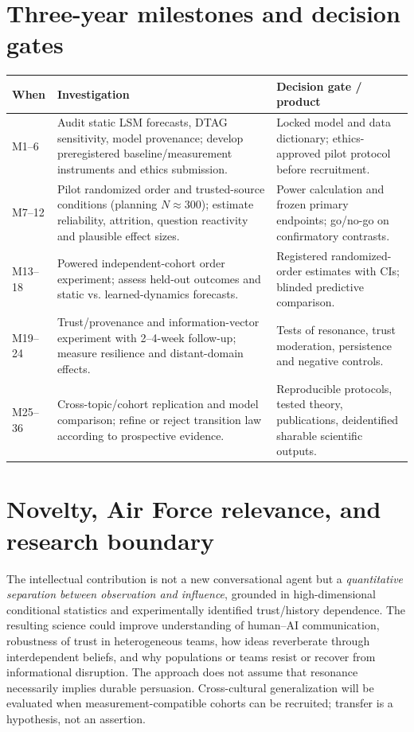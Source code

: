 \documentclass[10pt,letterpaper]{article}
\begin{document}
\section*{Three-year milestones and decision gates}
\vspace{1pt}
{\fontsize{8.7}{10.8}\selectfont
\renewcommand{\arraystretch}{1.12}
\begin{tabularx}{\linewidth}{@{}p{.70in}X p{2.25in}@{}}
\toprule
\textbf{When} & \textbf{Investigation} & \textbf{Decision gate / product}\\
\midrule
M1--6 & Audit static LSM forecasts, DTAG sensitivity, model provenance; develop preregistered baseline/measurement instruments and ethics submission. & Locked model and data dictionary; ethics-approved pilot protocol before recruitment.\\
M7--12 & Pilot randomized order and trusted-source conditions (planning $N\!\approx\!300$); estimate reliability, attrition, question reactivity and plausible effect sizes. & Power calculation and frozen primary endpoints; go/no-go on confirmatory contrasts.\\
M13--18 & Powered independent-cohort order experiment; assess held-out outcomes and static vs. learned-dynamics forecasts. & Registered randomized-order estimates with CIs; blinded predictive comparison.\\
M19--24 & Trust/provenance and information-vector experiment with 2--4-week follow-up; measure resilience and distant-domain effects. & Tests of resonance, trust moderation, persistence and negative controls.\\
M25--36 & Cross-topic/cohort replication and model comparison; refine or reject transition law according to prospective evidence. & Reproducible protocols, tested theory, publications, deidentified sharable scientific outputs.\\
\bottomrule
\end{tabularx}}

\section*{Novelty, Air Force relevance, and research boundary}
The intellectual contribution is not a new conversational agent but a \emph{quantitative separation between observation and influence}, grounded in high-dimensional conditional statistics and experimentally identified trust/history dependence. The resulting science could improve understanding of human--AI communication, robustness of trust in heterogeneous teams, how ideas reverberate through interdependent beliefs, and why populations or teams resist or recover from informational disruption. The approach does not assume that resonance necessarily implies durable persuasion. Cross-cultural generalization will be evaluated when measurement-compatible cohorts can be recruited; transfer is a hypothesis, not an assertion.
\end{document}
